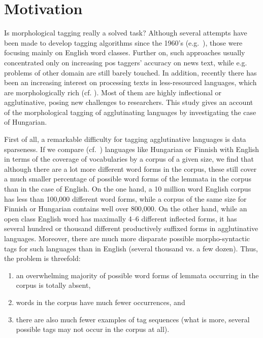 \section{Motivation}

Is morphological tagging really a solved task? 
Although several attempts have been made to develop tagging algorithms since the 1960’s (e.g.~\cite{Stolz1965,Klein1963}), those were focusing mainly on English word classes. 
Further on, such approaches usually concentrated only on increasing \gls{pos} taggers’ accuracy on news text, while e.g. problems of other domain are still barely touched. 
In addition, recently there has been an increasing interest on processing texts in less-resourced languages, which are morphologically rich (cf. \cite{SPMRL:2010,SPMRL:2011,SPMRL:2012,SPMRL:2013}). 
Most of them are highly inflectional or agglutinative, posing new challenges to researchers. This study gives an account of the morphological tagging of agglutinating languages by investigating the case of Hungarian. 

First of all, a remarkable difficulty for tagging agglutinative languages is data sparseness. If we compare (cf.~\cite{Oravecz2002a}) languages like Hungarian or Finnish with English in terms of the coverage of vocabularies by a corpus of a given size, we find that although there are a lot more different word forms in the corpus, these still cover a much smaller percentage of possible word forms of the lemmata in the corpus than in the case of English. 
On the one hand, a 10 million word English corpus has less than 100,000 different word forms, while a corpus of the same size for Finnish or Hungarian contains well over 800,000. On the other hand, while an open class English word has maximally 4--6 different inflected forms, it has several hundred or thousand different productively suffixed forms in agglutinative languages. Moreover, there are much more disparate possible morpho-syntactic tags for such languages than in English (several thousand vs. a few dozen). 
Thus, the problem is threefold:
\begin{enumerate}
  \item an overwhelming majority of possible word forms of lemmata occurring in the corpus is totally absent,
  \item words in the corpus have much fewer occurrences, and
  \item there are also much fewer examples of tag sequences (what is more, several possible tags may not occur in the corpus at all).
\end{enumerate}

